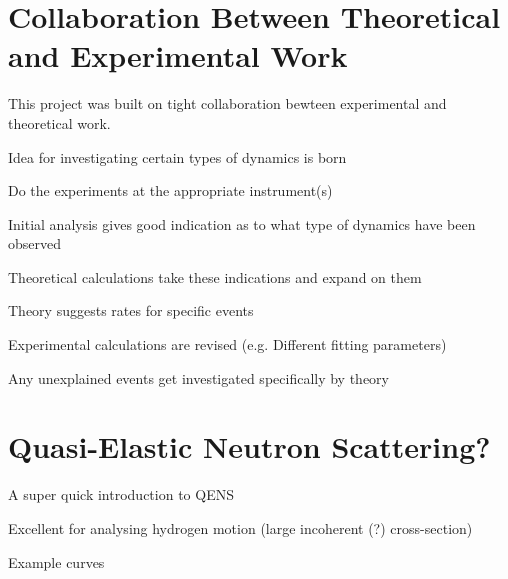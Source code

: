 \section{Collaboration Between Theoretical and Experimental Work}
\label{sec:cooperation}

This project was built on tight collaboration bewteen experimental and theoretical work.
\bit
\item Idea for investigating certain types of dynamics is born
\item Do the experiments at the appropriate instrument(s)
\item Initial analysis gives good indication as to what type of dynamics have been observed
\item Theoretical calculations take these indications and expand on them
\item Theory suggests rates for specific events
\item Experimental calculations are revised (e.g. Different fitting parameters)
\item Any unexplained events get investigated specifically by theory
\eit

\placeholder

\section{Quasi-Elastic Neutron Scattering?}
\label{sec:qens}
\bit
\item A super quick introduction to QENS
\item Excellent for analysing hydrogen motion (large incoherent (?) cross-section)
\item Example curves
\eit


\placeholder
